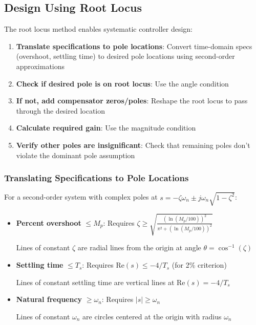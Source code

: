 \subsection{Design Using Root Locus}
\label{subsec:root_locus_design}

The root locus method enables systematic controller design:

\begin{enumerate}
    \item \textbf{Translate specifications to pole locations}: Convert time-domain specs (overshoot, settling time) to desired pole locations using second-order approximations

    \item \textbf{Check if desired pole is on root locus}: Use the angle condition

    \item \textbf{If not, add compensator zeros/poles}: Reshape the root locus to pass through the desired location

    \item \textbf{Calculate required gain}: Use the magnitude condition

    \item \textbf{Verify other poles are insignificant}: Check that remaining poles don't violate the dominant pole assumption
\end{enumerate}

\subsubsection{Translating Specifications to Pole Locations}

For a second-order system with complex poles at $s = -\zeta\omega_n \pm j\omega_n\sqrt{1-\zeta^2}$:

\begin{itemize}
    \item \textbf{Percent overshoot} $\leq M_p$: Requires $\zeta \geq \sqrt{\frac{(\ln(M_p/100))^2}{\pi^2 + (\ln(M_p/100))^2}}$

    Lines of constant $\zeta$ are radial lines from the origin at angle $\theta = \cos^{-1}(\zeta)$

    \item \textbf{Settling time} $\leq T_s$: Requires $\text{Re}(s) \leq -4/T_s$ (for 2\% criterion)

    Lines of constant settling time are vertical lines at $\text{Re}(s) = -4/T_s$

    \item \textbf{Natural frequency} $\geq \omega_n$: Requires $|s| \geq \omega_n$

    Lines of constant $\omega_n$ are circles centered at the origin with radius $\omega_n$
\end{itemize}

